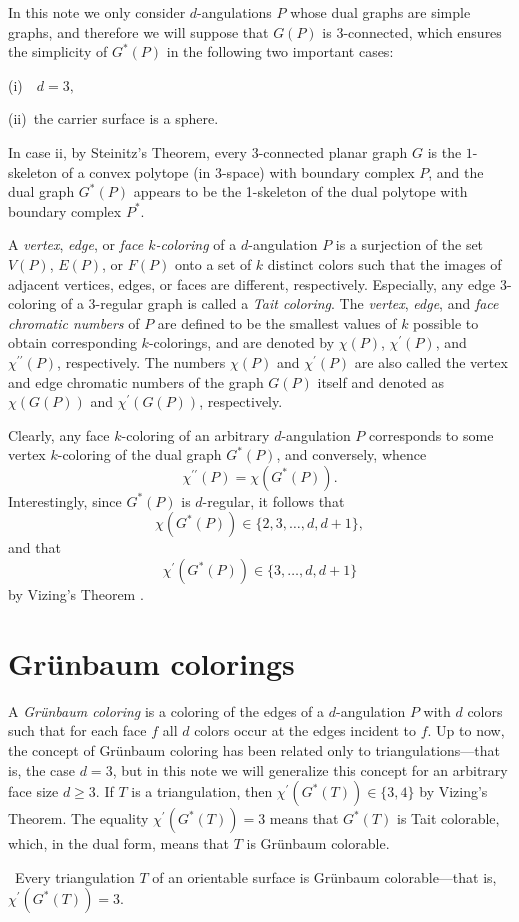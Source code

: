 \documentclass[12pt]{article}
\begin{document}
In this note we only consider $d$-angulations $P$  whose dual graphs are simple graphs, and therefore we will suppose that $G(P)$  is 3-connected, which ensures the simplicity of $G^*(P)$  in the following two important cases: 
\par\medskip
\noindent (i)~~$d = 3,$ 

\noindent (ii)~the carrier surface is a sphere. 
\par\medskip
In case ii, by Steinitz's Theorem, every 3-connected planar graph $G$ is the $1\mbox{-}$skeleton of a convex polytope (in 3-space) with boundary complex $P$,  and the dual graph $G^*(P)$ appears to be the 1-skeleton of the dual polytope with boundary complex $P^*$. 

A {\it vertex}, {\it edge}, or {\it face $k$-coloring} of a $d$-angulation $P$ is a surjection of the set $V(P)$,  $E(P)$, or $F(P)$  onto a set of $k$ distinct colors such that the images of adjacent vertices, edges, or faces are different, respectively. Especially, any edge 3-coloring of a 3-regular graph is called a {\it Tait coloring}. 
The {\it vertex}, {\it edge}, and {\it face chromatic numbers} of $P$ are defined to be the smallest values of $k$ possible to obtain corresponding $k$-colorings, and are denoted by $\chi(P)$, $\chi^\prime(P)$,  and $\chi^{\prime\prime}(P)$, respectively. The numbers $\chi(P)$ and $\chi^\prime(P)$  are also called the vertex and edge chromatic numbers of the graph $G(P)$  itself and denoted as $\chi(G(P))$  and $\chi^\prime(G(P))$,  respectively.

Clearly, any face $k$-coloring of an arbitrary $d$-angulation $P$  corresponds to some vertex $k$-coloring of the dual graph $G^*(P)$, and conversely, whence 
$$\chi^{\prime\prime}(P)=\chi(G^*(P)).$$  
Interestingly, since $G^*(P)$  is $d$-regular, it follows that 
$${{\chi(G^*(P)) \in \{2, 3, \ldots, d, d+1 \}}},$$ 
and that 
$$\chi ^{\prime} (G^* (P)) \in \{3, \ldots, d, d+1 \}$$ 
by Vizing's Theorem \cite{V}.

\section{Gr\"unbaum colorings}
 A {\it Gr\"unbaum coloring} is a coloring of the edges of a $d$-angulation $P$  with $d$  colors such that  for each face $f$  all $d$  colors occur at the edges incident to $f$.  Up to now, the concept of Gr\"unbaum coloring has been related only to triangulations---that is, the case $d = 3$, but in this note we will generalize this concept for an arbitrary face size $d \geqslant 3$.  If $T$  is a triangulation, then $\chi^{\prime}(G^*(T)) \in \{ 3,4\}$  by Vizing's Theorem. The equality $\chi^{\prime}(G^*(T))=3$  means that $G^*(T)$  is Tait colorable, 
which, in the dual form, means that $T$  is Gr\"unbaum colorable. 
\par\medskip    
\par\medskip 
{}~Every triangulation $T$  of an orientable surface is Gr\"unbaum colorable---that is, $\chi^{\prime}(G^*(T))=3$.
\par\medskip    
\par\medskip 
\end{document}
